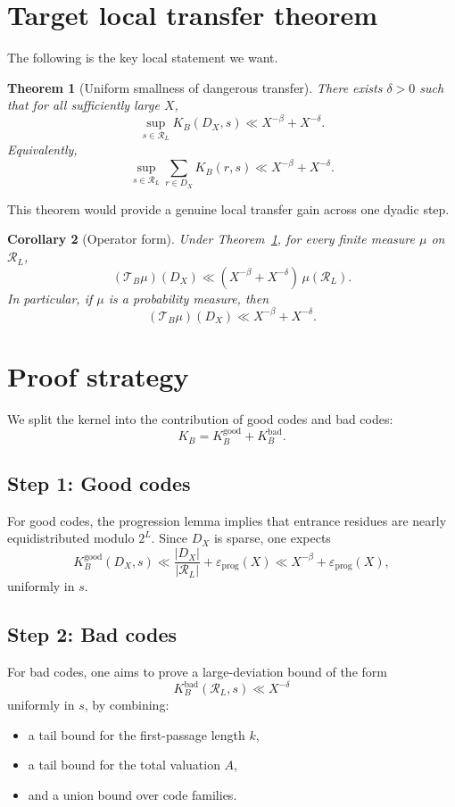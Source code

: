 \documentclass[11pt]{article}
\newtheorem{theorem}{Theorem}
\newtheorem{corollary}[theorem]{Corollary}
\theoremstyle{definition}
\theoremstyle{remark}
\newcommand{\1}{\mathbf{1}}
\newcommand{\Res}{\mathcal R_L}
\newcommand{\DX}{D_X}
\newcommand{\KB}{K_B}
\newcommand{\TB}{\mathcal T_B}
\begin{document}
\section{Target local transfer theorem}

The following is the key local statement we want.

\begin{theorem}[Uniform smallness of dangerous transfer]\label{thm:target}
There exists $\delta>0$ such that for all sufficiently large $X$,
\[
\sup_{s\in\Res}\KB(\DX,s)\ll X^{-\beta}+X^{-\delta}.
\]
Equivalently,
\[
\sup_{s\in\Res}\sum_{r\in \DX}\KB(r,s)\ll X^{-\beta}+X^{-\delta}.
\]
\end{theorem}

This theorem would provide a genuine local transfer gain across one dyadic step.

\begin{corollary}[Operator form]
Under Theorem~\ref{thm:target}, for every finite measure $\mu$ on $\Res$,
\[
(\TB\mu)(\DX)\ll (X^{-\beta}+X^{-\delta})\,\mu(\Res).
\]
In particular, if $\mu$ is a probability measure, then
\[
(\TB\mu)(\DX)\ll X^{-\beta}+X^{-\delta}.
\]
\end{corollary}

\section{Proof strategy}

We split the kernel into the contribution of good codes and bad codes:
\[
\KB=\KB^{\mathrm{good}}+\KB^{\mathrm{bad}}.
\]

\subsection*{Step 1: Good codes}
For good codes, the progression lemma implies that entrance residues are nearly equidistributed modulo $2^L$. Since $\DX$ is sparse, one expects
\[
\KB^{\mathrm{good}}(\DX,s)\ll \frac{|\DX|}{|\Res|}+\varepsilon_{\mathrm{prog}}(X)
\ll X^{-\beta}+\varepsilon_{\mathrm{prog}}(X),
\]
uniformly in $s$.

\subsection*{Step 2: Bad codes}
For bad codes, one aims to prove a large-deviation bound of the form
\[
\KB^{\mathrm{bad}}(\Res,s)\ll X^{-\delta}
\]
uniformly in $s$, by combining:
\begin{itemize}[leftmargin=2em]
\item a tail bound for the first-passage length $k$,
\item a tail bound for the total valuation $A$,
\item and a union bound over code families.
\end{itemize}
\end{document}
